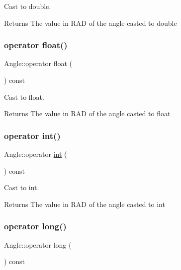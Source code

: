 Cast to double. 

\begin{DoxyReturn}{Returns}
The value in R\+AD of the angle casted to double 
\end{DoxyReturn}
\mbox{\label{class_angle_a88d0ffaac106cff8233821b2f970b137}} 
\subsubsection{\texorpdfstring{operator float()}{operator float()}}
{\footnotesize\ttfamily Angle\+::operator float (\begin{DoxyParamCaption}{ }\end{DoxyParamCaption}) const\hspace{0.3cm}{\ttfamily [inline]}}



Cast to float. 

\begin{DoxyReturn}{Returns}
The value in R\+AD of the angle casted to float 
\end{DoxyReturn}
\mbox{\label{class_angle_ab4837cee1b926cd3f8f08c91d2d08c70}} 
\subsubsection{\texorpdfstring{operator int()}{operator int()}}
{\footnotesize\ttfamily Angle\+::operator \mbox{\hyperlink{draw_8hh_aa620a13339ac3a1177c86edc549fda9b}{int}} (\begin{DoxyParamCaption}{ }\end{DoxyParamCaption}) const\hspace{0.3cm}{\ttfamily [inline]}}



Cast to int. 

\begin{DoxyReturn}{Returns}
The value in R\+AD of the angle casted to int 
\end{DoxyReturn}
\mbox{\label{class_angle_a497355a5d68f92e7801ee4072e234185}} 
\subsubsection{\texorpdfstring{operator long()}{operator long()}}
{\footnotesize\ttfamily Angle\+::operator long (\begin{DoxyParamCaption}{ }\end{DoxyParamCaption}) const\hspace{0.3cm}{\ttfamily [inline]}}



